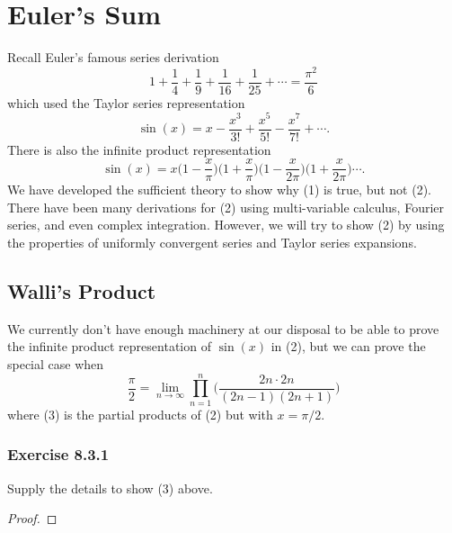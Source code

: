 \section{Euler's Sum}

Recall Euler's famous series derivation
\[  1 + \frac{ 1 }{ 4 }  + \frac{ 1 }{ 9  }  + \frac{ 1 }{ 16 } + \frac{ 1 }{ 25 } + \dotsb = \frac{ \pi^{2} }{ 6 } \] which used the Taylor series representation 
\[  \sin(x) = x - \frac{ x^{3} }{ 3! } + \frac{ x^{5} }{ 5! } - \frac{ x^{7} }{ 7! } + \dotsb. \tag{1} \] There is also the infinite product representation 
\[  \sin(x) = x \Big( 1 - \frac{ x }{ \pi }  \Big) \Big( 1 + \frac{ x }{ \pi }  \Big) \Big(  1 - \frac{ x }{ 2 \pi }  \Big) \Big( 1 + \frac{ x  }{ 2 \pi }  \Big) \dotsb. \tag{2} \] We have developed the sufficient theory to show why (1) is true, but not (2). There have been many derivations for (2) using multi-variable calculus, Fourier series, and even complex integration. However, we will try to show (2) by using the properties of uniformly convergent series and Taylor series expansions.

\subsection{Walli's Product}

We currently don't have enough machinery at our disposal to be able to prove the infinite product representation of \( \sin(x)  \) in (2), but we can prove the special case when 
\[  \frac{ \pi }{ 2 }  = \lim_{ n \to \infty  }  \prod_{n=1}^{n} \Big(  \frac{ 2n \cdot 2n  }{ (2n-1)(2n+1) }  \Big) \tag{3} \] where (3) is the partial products of (2) but with \( x = \pi / 2  \).

\subsubsection{Exercise 8.3.1} Supply the details to show (3) above.
\begin{proof}

\end{proof}

